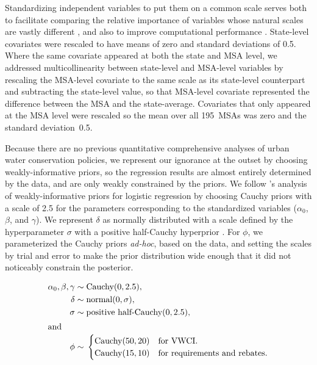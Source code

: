 \documentclass[draft,linenumbers]{agujournal}
\begin{document}
Standardizing independent variables to put them on a common scale serves both
to facilitate comparing the relative importance of variables whose natural scales are
vastly different
\citep[pp.~55--57]{gelman:prior:2008,gelman:arm:2007},
and also to improve computational performance \citep{stan:manual:2015}.
State-level covariates were rescaled to have means of zero and
standard deviations of 0.5.
Where the same covariate appeared at both the state and
MSA level,
we addressed multicollinearity between state-level and MSA-level
variables by rescaling the MSA-level covariate
to the same scale as its state-level counterpart and
subtracting the state-level value,
so that MSA-level covariate represented the difference between the MSA and
the state-average.
Covariates that only appeared at the MSA level were rescaled so
the mean over all 195~MSAs was zero and the standard deviation~0.5.

Because there are no previous quantitative comprehensive analyses of urban
water conservation policies, we represent our ignorance at the outset by
choosing weakly-informative priors, so the regression results are almost
entirely determined by the data, and are only weakly constrained by the priors.
We follow \citet{gelman:prior:2008}'s analysis
of weakly-informative priors for logistic regression
by choosing Cauchy priors with a scale of 2.5 for the
parameters corresponding to the standardized variables ($\alpha_0$, $\beta$,
and $\gamma$).
We represent $\delta$ as normally distributed
with a scale defined by the hyperparameter $\sigma$ with a positive half-Cauchy
hyperprior \citep{gelman:prior:2008}.
For $\phi$, we parameterized the Cauchy priors
\emph{ad-hoc}, based on the data, and setting the scales by trial and error
to make the prior distribution wide enough that it did not noticeably constrain
the posterior.
\begin{linenomath*}
\begin{align}
\alpha_0, \beta, \gamma \sim{} & \text{Cauchy}(0,2.5),\\
\delta \sim{}& \text{normal}(0,\sigma),\\
\sigma \sim{}& \text{positive half-Cauchy}(0,2.5),\\
\intertext{and}
\phi \sim{}& \begin{cases}
\text{Cauchy}(50,20) & \text{for VWCI}. \\
\text{Cauchy}(15,10) & \text{for requirements and rebates}. \\
\end{cases}
\end{align}
\end{linenomath*}
\end{document}
